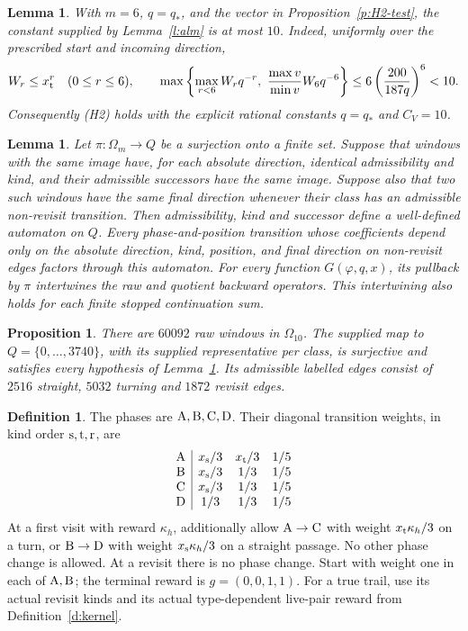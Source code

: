 \documentclass[11pt,reqno]{amsart}
\newtheorem{lemma}[theorem]{Lemma}
\newtheorem{proposition}[theorem]{Proposition}
\theoremstyle{definition}
\newtheorem{definition}[theorem]{Definition}
\theoremstyle{remark}
\begin{document}
\begin{lemma}\label{l:H2-CV}
With \(m=6\), \(q=q_*\), and the vector in Proposition~\ref{p:H2-test},
the constant supplied by Lemma~\ref{l:alm} is at most \(10\).
Indeed, uniformly over the prescribed start and incoming direction,
\[
 W_r\le x_{\rm t}^r\quad(0\le r\le6),\qquad
 \max\left\{\max_{r<6}W_rq^{-r},\
                 \frac{\max v}{\min v}W_6q^{-6}\right\}
 \le6\left(\frac{200}{187q}\right)^6<10.
\]
Consequently (H2) holds with the explicit rational constants
\(q=q_*\) and \(C_V=10\).
\end{lemma}

\begin{lemma}\label{l:automaton-quotient}
Let \(\pi:\Omega_m\to Q\) be a surjection onto a finite set.
Suppose that windows with the same image have, for each absolute
direction, identical admissibility and kind, and their admissible
successors have the same image. Suppose also that two such windows
have the same final direction whenever their class has an admissible
non-revisit transition.
Then admissibility, kind and successor define a well-defined automaton
on \(Q\). Every phase-and-position transition whose coefficients
depend only on the absolute direction, kind, position, and final
direction on non-revisit edges factors through this automaton.
For every function \(G(\varphi,q,x)\), its pullback by \(\pi\)
intertwines the raw and quotient backward operators. This
intertwining also holds for each finite stopped continuation sum.
\end{lemma}

\begin{proposition}\label{p:automaton10}
There are \(60092\) raw windows in \(\Omega_{10}\).
The supplied map to \(Q=\{0,\ldots,3740\}\), with its supplied
representative per class, is surjective and satisfies every
hypothesis of Lemma~\ref{l:automaton-quotient}.
Its admissible labelled edges consist of \(2516\) straight,
\(5032\) turning and \(1872\) revisit edges.
\end{proposition}

\begin{definition}\label{d:phaseweights}
The phases are \({\rm A},{\rm B},{\rm C},{\rm D}\). Their
diagonal transition weights, in kind order \({\rm s},{\rm t},{\rm r}\), are
\[
 \begin{array}{c|ccc}
 {\rm A}&x_{\rm s}/3&x_{\rm t}/3&1/5\\
 {\rm B}&x_{\rm s}/3&1/3&1/5\\
 {\rm C}&x_{\rm s}/3&1/3&1/5\\
 {\rm D}&1/3&1/3&1/5
 \end{array}
\]
At a first visit with reward \(\kappa_h\), additionally allow
\({\rm A}\to{\rm C}\) with weight \(x_{\rm t}\kappa_h/3\) on a turn,
or \({\rm B}\to{\rm D}\) with weight \(x_{\rm s}\kappa_h/3\)
on a straight passage. No other phase change is allowed.
At a revisit there is no phase change.
Start with weight one in each of \({\rm A},{\rm B}\);
the terminal reward is \(g=(0,0,1,1)\).
For a true trail, use its actual revisit kinds and its actual
type-dependent live-pair reward from Definition~\ref{d:kernel}.
\end{definition}
\end{document}
